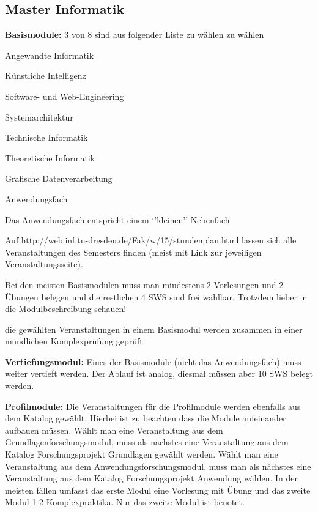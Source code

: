 \documentclass[a4paper,12pt]{report}
\begin{document}
\subsection{Master Informatik}
\begin{itemize*}
	\item \textbf{Basismodule:} 3 von 8 sind aus folgender Liste zu wählen zu wählen
	\begin{itemize*}
		\item Angewandte Informatik 	
		\item Künstliche Intelligenz 	
		\item Software- und Web-Engineering  
		\item Systemarchitektur 	
		\item Technische Informatik 	 
		\item Theoretische Informatik 
		\item Grafische Datenverarbeitung 
		\item Anwendungsfach
	\end{itemize*}	
	\item Das Anwendungsfach entspricht einem `'kleinen'' Nebenfach
	\item Auf http://web.inf.tu-dresden.de/Fak/w/15/stundenplan.html lassen sich alle Veranstaltungen des Semesters finden (meist mit Link zur jeweiligen Veranstaltungsseite).
	\item Bei den meisten Basismodulen muss man mindestens 2 Vorlesungen und 2 Übungen belegen und die restlichen 4 SWS sind frei wählbar. Trotzdem lieber in die Modulbeschreibung schauen!
	\item die gewählten Veranstaltungen in einem Basismodul werden zusammen in einer mündlichen Komplexprüfung geprüft.
	\item \textbf{Vertiefungsmodul:} Eines der Basismodule (nicht das Anwendungsfach) muss weiter vertieft werden. Der Ablauf ist analog, diesmal müssen aber 10 SWS belegt werden.
	\item \textbf{Profilmodule:} Die Veranstaltungen für die Profilmodule werden ebenfalls aus dem Katalog gewählt. Hierbei ist zu beachten dass die Module aufeinander aufbauen müssen. Wählt man eine Veranstaltung aus dem Grundlagenforschungsmodul, muss als nächstes eine Veranstaltung aus dem Katalog Forschungsprojekt Grundlagen gewählt werden. Wählt man eine Veranstaltung aus dem Anwendungsforschungsmodul, muss man als nächstes eine Veranstaltung aus dem Katalog Forschungsprojekt Anwendung wählen. In den meisten fällen umfasst das erste Modul eine Vorlesung mit Übung und das zweite Modul 1-2 Komplexpraktika. Nur das zweite Modul ist benotet.

\end{itemize*}
\end{document}
